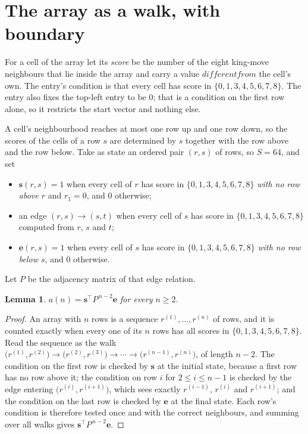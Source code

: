 \documentclass[11pt,a4paper]{article}
\theoremstyle{plain}
\newtheorem{lemma}[theorem]{Lemma}
\theoremstyle{definition}
\begin{document}
\section{The array as a walk, with boundary}

For a cell of the array let its \emph{score} be the number of the eight king-move neighbours that lie inside
the array and carry a value $different from$ the cell's own. The entry's condition is that every cell
has score in $\{0,1,3,4,5,6,7,8\}$. The entry also fixes the top-left entry to be $0$; that is a condition on the first row alone, so it restricts the start vector and nothing else.

A cell's neighbourhood reaches at most one row up and one row down, so the scores of the
cells of a row $s$ are determined by $s$ together with the row above and the row below.
Take as state an ordered pair $(r,s)$ of rows, so $S=64$, and set
\begin{itemize}
\item $\mathbf{s}(r,s)=1$ when every cell of $r$ has score in $\{0,1,3,4,5,6,7,8\}$ \emph{with no row
above $r$} and $r_1=0$, and $0$ otherwise;
\item an edge $(r,s)\to(s,t)$ when every cell of $s$ has score in $\{0,1,3,4,5,6,7,8\}$ computed from
$r$, $s$ and $t$;
\item $\mathbf{e}(r,s)=1$ when every cell of $s$ has score in $\{0,1,3,4,5,6,7,8\}$ \emph{with no row
below $s$}, and $0$ otherwise.
\end{itemize}
Let $P$ be the adjacency matrix of that edge relation.

\begin{lemma}\label{lem:walk}
$a(n)=\mathbf{s}^{\!\top}P^{\,n-2}\mathbf{e}$ for every $n\ge2$.
\end{lemma}

\begin{proof}
An array with $n$ rows is a sequence $r^{(1)},\dots,r^{(n)}$ of rows, and it is counted
exactly when every one of its $n$ rows has all scores in $\{0,1,3,4,5,6,7,8\}$. Read the sequence as the
walk $\bigl(r^{(1)},r^{(2)}\bigr)\to\bigl(r^{(2)},r^{(3)}\bigr)\to\cdots\to
\bigl(r^{(n-1)},r^{(n)}\bigr)$, of length $n-2$. The condition on the first row is
checked by $\mathbf{s}$ at the initial state, because a first row has no row above it; the
condition on row $i$ for $2\le i\le n-1$ is checked by the edge entering
$\bigl(r^{(i)},r^{(i+1)}\bigr)$, which sees exactly $r^{(i-1)}$, $r^{(i)}$ and
$r^{(i+1)}$; and the condition on the last row is checked by $\mathbf{e}$ at the final
state. Each row's condition is therefore tested once and with the correct neighbours, and
summing over all walks gives $\mathbf{s}^{\!\top}P^{\,n-2}\mathbf{e}$.
\end{proof}
\end{document}
